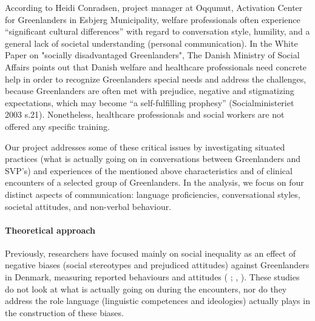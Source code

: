 \documentclass[twocolumn, issue, rga, authordate]{jote-new-article}
\begin{document}
According to Heidi Conradsen, project manager at Oqqumut, Activation Center for Greenlanders in Esbjerg Municipality, welfare professionals often experience ``significant cultural differences'' with regard to conversation style, humility, and a general lack of societal understanding (personal communication). In the White Paper on "socially disadvantaged Greenlanders", The Danish Ministry of Social Affairs points out that Danish welfare and healthcare professionals need concrete help in order to recognize Greenlanders special needs and address the challenges, because Greenlanders are often met with prejudice, negative and stigmatizing expectations, which may become ``a self-fulfilling prophesy'' (Socialministeriet 2003 s.21). Nonetheless, healthcare professionals and social workers are not offered any specific training.

Our project addresses some of these critical issues by investigating situated practices (what is actually going on in conversations between Greenlanders and SVP's) and experiences of the mentioned above characteristics and of clinical encounters of a selected group of Greenlanders. In the analysis, we focus on four distinct aspects of communication: language proficiencies, conversational styles, societal attitudes, and non-verbal behaviour.


\paragraph{Theoretical approach}


Previously, researchers have focused mainly on social inequality as an effect of negative biases (social stereotypes and prejudiced attitudes)
against Greenlanders in Denmark, measuring reported behaviours and attitudes ( \citeyear{Togeby2004}; , \citeyear{laage-petersen2015}).
These studies do not look at what is actually going on during the encounters, nor do they address the role language (linguistic competences and ideologies) actually plays in the construction of these biases.
\end{document}
